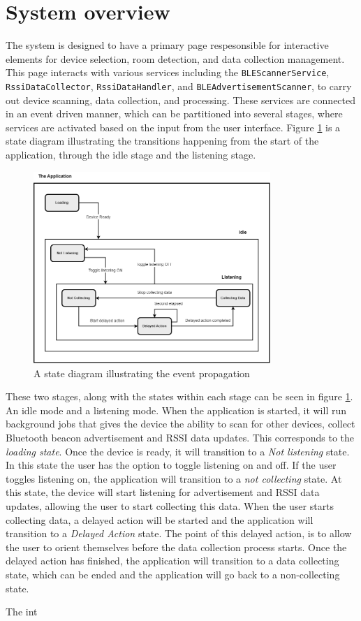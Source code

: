 \section{System overview}
The system is designed to have a primary page respesonsible for interactive elements for device selection, room detection, and data collection management. This page interacts with various services including the \texttt{BLEScannerService}, \texttt{RssiDataCollector}, \texttt{RssiDataHandler}, and \texttt{BLEAdvertisementScanner}, to carry out device scanning, data collection, and processing.
These services are connected in an event driven manner, which can be partitioned into several stages, where services are activated based on the input from the user interface. 
Figure \ref{fig:StateDiagram} is a state diagram illustrating the transitions happening from the start of the application, through the idle stage and the listening stage. 

\begin{figure}[H]
    \centering
    \includegraphics[width=0.8\textwidth]{images/BLE State diagram.drawio.png}
    \caption{A state diagram illustrating the event propagation}
    \label{fig:StateDiagram}
\end{figure}

These two stages, along with the states within each stage can be seen in figure \ref{fig:StateDiagram}. 
An idle mode and a listening mode. 
When the application is started, it will run background jobs that gives the device the ability to scan for other devices, collect Bluetooth beacon advertisement and RSSI data updates. 
This corresponds to the \textit{loading state}.
Once the device is ready, it will transition to a \textit{Not listening} state. 
In this state the user has the option to toggle listening on and off. 
If the user toggles listening on, the application will transition to a \textit{not collecting} state.
At this state, the device will start listening for advertisement and RSSI data updates, allowing the user to start collecting this data.
When the user starts collecting data, a delayed action will be started and the application will transition to a \textit{Delayed Action} state.
The point of this delayed action, is to allow the user to orient themselves before the data collection process starts.
Once the delayed action has finished, the application will transition to a data collecting state, which can be ended and the application will go back to a non-collecting state.

The int

